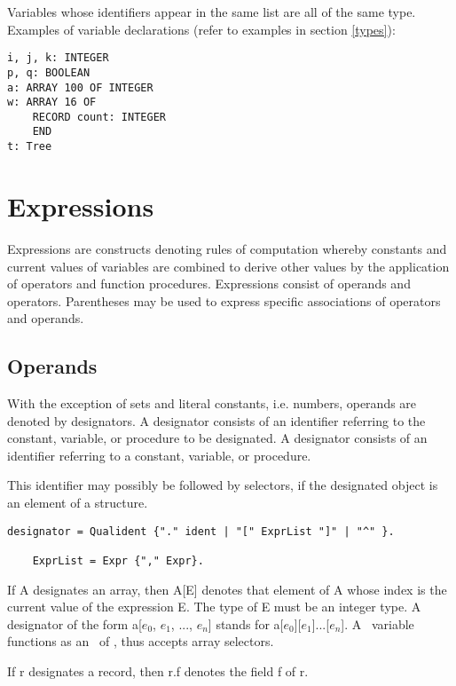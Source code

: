 \documentclass[12pt]{article}
\begin{document}
Variables whose identifiers appear in the same list are all of the same type. Examples of variable declarations (refer to examples in section \ref{types}):

\begin{lstlisting}[style=example]
i, j, k: INTEGER
p, q: BOOLEAN
a: ARRAY 100 OF INTEGER
w: ARRAY 16 OF
    RECORD count: INTEGER
    END
t: Tree
\end{lstlisting}

\section{Expressions}

Expressions are constructs denoting rules of computation whereby constants and current values of variables are combined to derive other values by the application of operators and function procedures. Expressions consist of operands and operators. Parentheses may be used to express specific associations of operators and operands.

\subsection{Operands}
\label{operands}

With the exception of sets and literal constants, i.e. numbers, operands are denoted by designators. A designator consists of an identifier referring to the constant, variable, or procedure to be designated. A designator consists of an identifier referring to a constant, variable, or procedure. 

This identifier may possibly be followed by selectors, if the designated object is an element of a structure.

\begin{lstlisting}[style=ebnf]
    designator = Qualident {"." ident | "[" ExprList "]" | "^" }.
    
    ExprList = Expr {"," Expr}.
\end{lstlisting}


If A designates an array, then A[E] denotes that element of A whose index is the current value of the expression E. The type of E must be an integer type. A designator of the form a[$e_0$, $e_1$, ..., $e_n$] stands for a[$e_0$][$e_1$]...[$e_n$]. A \STRING\ variable functions as an \ARRAY\ of \CHAR, thus accepts array selectors.

If r designates a record, then r.f denotes the field f of r.
\end{document}
